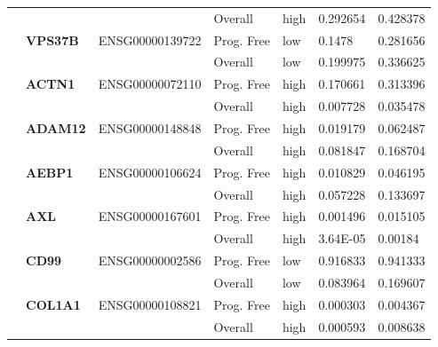 \begin{spacing}{1}
{\begin{longtable}{|>{\bfseries}p{2cm}|>{\bfseries}p{1.9cm}|p{2.8cm}|p{2cm}|p{2cm}|p{1.5cm}|p{1.5cm}|}
            \hhline{~~~----}
             &          &                 & Overall    & high & 0.292654 & 0.428378                \\
            \hhline{~======}
             & VPS37B   & ENSG00000139722 & Prog. Free & low  & 0.1478   & 0.281656                \\
            \hhline{~~~----}
             &          &                 & Overall    & low  & 0.199975 & 0.336625                \\
            \hhline{~======}
            \hline


            \multirow{2}{3cm}{True}
             & ACTN1    & ENSG00000072110 & Prog. Free & high & 0.170661 & 0.313396                \\
            \hhline{~~~----}
             &          &                 & Overall    & high & 0.007728 & 0.035478                \\
            \hhline{~======}
             & ADAM12   & ENSG00000148848 & Prog. Free & high & 0.019179 & 0.062487                \\
            \hhline{~~~----}
             &          &                 & Overall    & high & 0.081847 & 0.168704                \\
            \hhline{~======}
             & AEBP1    & ENSG00000106624 & Prog. Free & high & 0.010829 & 0.046195                \\
            \hhline{~~~----}
             &          &                 & Overall    & high & 0.057228 & 0.133697                \\
            \hhline{~======}
             & AXL      & ENSG00000167601 & Prog. Free & high & 0.001496 & 0.015105                \\
            \hhline{~~~----}
             &          &                 & Overall    & high & 3.64E-05 & 0.00184                 \\
            \hhline{~======}
             & CD99     & ENSG00000002586 & Prog. Free & low  & 0.916833 & 0.941333                \\
            \hhline{~~~----}
             &          &                 & Overall    & low  & 0.083964 & 0.169607                \\
            \hhline{~======}
             & COL1A1   & ENSG00000108821 & Prog. Free & high & 0.000303 & 0.004367                \\
            \hhline{~~~----}
             &          &                 & Overall    & high & 0.000593 & 0.008638                \\

\end{longtable}}
\end{spacing}
